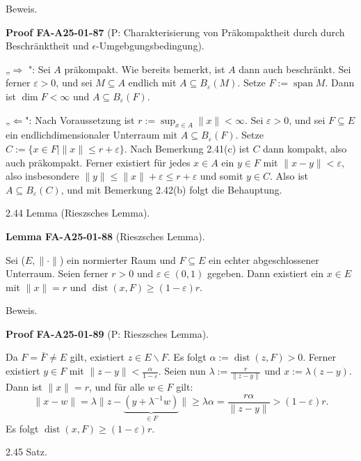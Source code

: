 \documentclass[10pt, letterpaper]{article}
\newcommand{\CustomHeading}[3]{%
  \par\medskip\noindent%
  \textbf{#1 #2} \textnormal{(#3)}.\enskip%
}
\newenvironment{LEM}[2]{\begin{unitbox}\CustomHeading{Lemma}{#1}{#2}}{\end{unitbox}}
\newenvironment{PROOF}[2]{\begin{unitbox}\CustomHeading{Proof}{#1}{#2}}{\end{unitbox}}
\begin{document}
Beweis. 

\begin{PROOF}{FA-A25-01-87}{P: Charakterisierung von Präkompaktheit durch durch Beschränktheit und $\epsilon$-Umgebgungsbedingung}
„$\Longrightarrow$ ": Sei $A$ präkompakt. Wie bereits bemerkt, ist $A$ dann auch beschränkt. Sei ferner $\varepsilon>0$, und sei $M \subseteq A$ endlich mit $A \subseteq B_{\varepsilon}(M)$. Setze $F:=\operatorname{span} M$. Dann ist $\operatorname{dim} F<\infty$ und $A \subseteq B_{\varepsilon}(F)$.

„$\Longleftarrow$": Nach Voraussetzung ist $r:=\sup _{x \in A}\|x\|<\infty$. Sei $\varepsilon>0$, und sei $F \subseteq E$ ein endlichdimensionaler Unterraum mit $A \subseteq B_{\varepsilon}(F)$. Setze $C:=\{x \in F \mid\|x\| \leq r+\varepsilon\}$. Nach Bemerkung 2.41(c) ist $C$ dann kompakt, also auch präkompakt. Ferner existiert für jedes $x \in A$ ein $y \in F$ mit $\|x-y\|<\varepsilon$, also insbesondere $\|y\| \leq\|x\|+\varepsilon \leq r+\varepsilon$ und somit $y \in C$. Also ist $A \subseteq B_{\varepsilon}(C)$, und mit Bemerkung 2.42(b) folgt die Behauptung.
\end{PROOF}



2.44 Lemma (Rieszsches Lemma). 


\begin{LEM}{FA-A25-01-88}{Rieszsches Lemma}
Sei ($E,\|\cdot\|$) ein normierter Raum und $F\subseteq E$ ein echter abgeschlossener Unterraum. Seien ferner $r>0$ und $\varepsilon \in(0,1)$ gegeben. Dann existiert ein $x \in E$ mit $\|x\|=r$ und $\operatorname{dist}(x, F) \geq(1-\varepsilon) r$.
\end{LEM}

Beweis. 

\begin{PROOF}{FA-A25-01-89}{P: Rieszsches Lemma}
Da $F=\bar{F} \neq E$ gilt, existiert $z \in E \backslash F$. Es folgt $\alpha:=\operatorname{dist}(z, F)>0$. Ferner existiert $y \in F$ mit $\|z-y\|<\frac{\alpha}{1-\varepsilon}$. Seien nun $\lambda:=\frac{r}{\|z-y\|}$ und $x:=\lambda(z-y)$. Dann ist $\|x\|=r$, und für alle $w \in F$ gilt:
$$
\|x-w\|=\lambda\|z-\underbrace{\left(y+\lambda^{-1} w\right)}_{\in F}\| \geq \lambda \alpha=\frac{r \alpha}{\|z-y\|}>(1-\varepsilon) r .
$$
Es folgt $\operatorname{dist}(x, F) \geq(1-\varepsilon) r$.
\end{PROOF}



2.45 Satz. 
\end{document}
